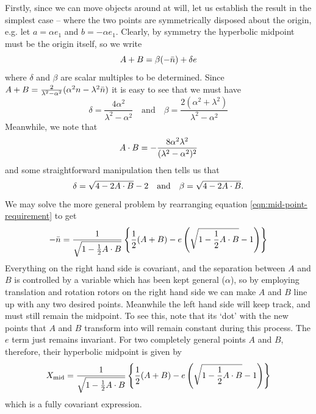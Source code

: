 Firstly, since we can move objects around at will, let us
establish the result in the simplest case -- where the two
points are symmetrically disposed about the origin, e.g.
let $a=\alpha e_1$ and $b=-\alpha e_1$. Clearly, by
symmetry the hyperbolic midpoint must be the origin
itself, so we write
%
\begin{equation} \label{eqn:mid-point-requirement}
A+B = \beta (-\bar{n}) + \delta e
\end{equation}
%
where $\delta$ and $\beta$ are scalar multiples to be determined.
Since $A+B = \frac{2}{\lambda^2 - \alpha^2}(\alpha^2 n - \lambda^2
\bar{n})$ it is easy to see that we must have
%
\begin{equation}
\delta = \frac{4\alpha^2}{\lambda^2-\alpha^2} \quad
\text{and} \quad \beta =
\frac{2(\alpha^2+\lambda^2)}{\lambda^2-\alpha^2}
\end{equation}
%
Meanwhile, we note that
%
\begin{equation}
A\cdot B = -\frac{8 \alpha^2
\lambda^2}{(\lambda^2-\alpha^2)^2}
\end{equation}
%
and some straightforward manipulation then tells us that
%
\begin{equation} \label{eqn:delta-beta-results}
\delta=\sqrt{4-2 A\cdot B} -2 \quad \text{and} \quad \beta
= \sqrt{4-2 A\cdot B}.
\end{equation}
%
We may solve the more general problem by rearranging 
equation \ref{eqn:mid-point-requirement} to get
%
\begin{equation}
-\bar{n} = \frac{1}{\sqrt{1-\frac{1}{2} A \cdot B}} \left\{
\frac{1}{2} (A+B) - e \left(\sqrt{1-\frac{1}{2} A \cdot
B}-1\right) \right\}
\end{equation}
%
Everything on the right hand side is covariant, and the separation between
$A$ and $B$ is controlled by a variable which has been kept general
($\alpha$), so by employing translation and rotation rotors on the
right hand side we can make $A$ and $B$ line up with any two desired
points. Meanwhile the left hand side will keep track, and must still
remain the midpoint. To see this, note that its `dot' with the
new points that $A$ and $B$ transform into will remain constant
during this process. The $e$ term just remains invariant. For two
completely general points $A$ and $B$, therefore, their
hyperbolic midpoint is given by
%
\begin{equation} \label{eqn:mid-point-expr}
X_{\rm mid} = \frac{1}{\sqrt{1-\frac{1}{2} A \cdot B}}
\left\{ \frac{1}{2} (A+B) - e \left(\sqrt{1-\frac{1}{2} A \cdot
B}-1\right) \right\}
\end{equation}
%
which is a fully covariant expression.

